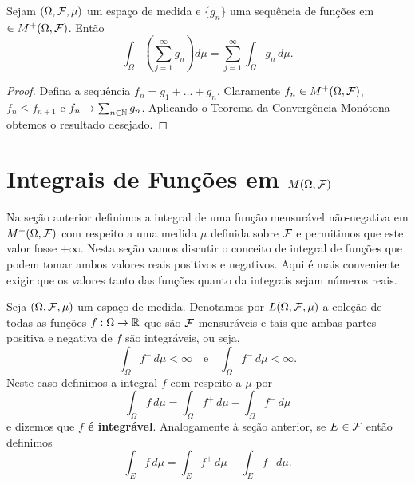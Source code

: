 \begin{corolario}
Sejam $(\Omega,\mathcal{F},\mu)$ um espaço de medida e 
$\{g_n\}$ uma sequência de funções em 
$\in M^{+}(\Omega,\mathcal{F})$. Então 
	\[
		\int_{\Omega} \left(\sum_{j=1}^{\infty} g_n\right) d\mu
		=
		\sum_{j=1}^{\infty}\int_{\Omega}  g_n\, d\mu.
	\]  
\end{corolario}


\begin{proof}
Defina a sequência $f_n=g_1+\ldots+g_n$.
Claramente $f_n\in M^{+}(\Omega,\mathcal{F})$,
$f_n\leq f_{n+1}$ e $f_n\to \sum_{n\in \mathbb{N}} g_n$. 
Aplicando o Teorema da Convergência Monótona obtemos o resultado
desejado.
\end{proof}




\section{Integrais de Funções em $M(\Omega,\mathcal{F})$  }

Na seção anterior definimos a integral de uma 
função mensurável não-negativa em $M^{+}(\Omega,\mathcal{F})$ 
com respeito a uma medida $\mu$ definida sobre $\mathcal{F}$ 
e permitimos que este valor fosse $+\infty$.
Nesta seção vamos discutir o conceito de integral
de funções que podem tomar ambos valores reais
positivos e negativos. Aqui é mais conveniente 
exigir que os valores tanto das funções quanto 
da integrais sejam números reais.


\begin{definicao}
Seja $(\Omega,\mathcal{F},\mu)$ um espaço de medida. 
Denotamos por $L(\Omega,\mathcal{F},\mu)$ a coleção 
de todas as funções $f:\Omega\to\mathbb{R}$ que 
são $\mathcal{F}$-mensuráveis e tais que ambas
partes positiva e negativa de $f$ são integráveis, 
ou seja,
\[
	\int_{\Omega} f^+\, d\mu<\infty
	\quad\text{e}\quad
	\int_{\Omega} f^-\, d\mu<\infty.
\]
Neste caso definimos a integral $f$ 
com respeito a $\mu$ por
	\[
		\int_{\Omega} f\, d\mu
		=
		\int_{\Omega} f^{+}\, d\mu
		-
		\int_{\Omega} f^{-}\, d\mu
	\]
e dizemos que {\bf $f$ é integrável}.
Analogamente à seção anterior, se $E\in \mathcal{F}$ então definimos 
	\[
		\int_{E} f\, d\mu 
		=
		\int_{E} f^{+}\, d\mu - \int_{E} f^{-}\, d\mu.
	\]
\end{definicao}

